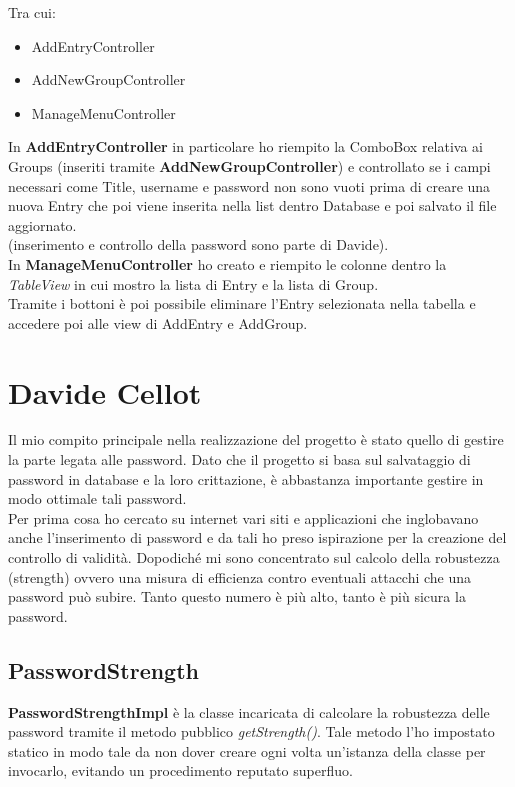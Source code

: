 \documentclass[a4paper,12pt]{report}
\begin{document}
Tra cui:
\begin{itemize}
  \item AddEntryController
  \item AddNewGroupController
  \item ManageMenuController
\end{itemize}

In \textbf{AddEntryController} in particolare ho riempito la ComboBox relativa ai Groups (inseriti
tramite \textbf{AddNewGroupController}) e controllato se i campi necessari come Title, username e
password non sono vuoti prima di creare una nuova Entry che poi viene inserita nella list dentro Database
e poi salvato il file aggiornato.\\(inserimento e controllo della password sono parte di Davide).\\

In \textbf{ManageMenuController} ho creato e riempito le colonne dentro la \textit{TableView} in cui
mostro la lista di Entry e la lista di Group.\\Tramite i bottoni è poi possibile eliminare l'Entry
selezionata nella tabella e accedere poi alle view di AddEntry e AddGroup.


\section*{Davide Cellot}
Il mio compito principale nella realizzazione del progetto è stato quello di gestire la parte legata alle password. Dato che il progetto si basa sul salvataggio di password in database e la loro crittazione, è abbastanza importante gestire in modo ottimale tali password.\\

Per prima cosa ho cercato su internet vari siti e applicazioni che inglobavano anche l’inserimento di password e da tali ho preso ispirazione per la creazione del controllo di validità. Dopodiché mi sono concentrato sul calcolo della robustezza (strength) ovvero una misura di efficienza contro eventuali attacchi che una password può subire. Tanto questo numero è più alto, tanto è più sicura la password.\\

\subsection*{PasswordStrength}

\textbf{PasswordStrengthImpl} è la classe incaricata di calcolare la robustezza delle password tramite il metodo pubblico \textit{getStrength()}. Tale metodo l’ho impostato statico in modo tale da non dover creare ogni volta un’istanza della classe per invocarlo, evitando un procedimento reputato superfluo.\\
\end{document}

